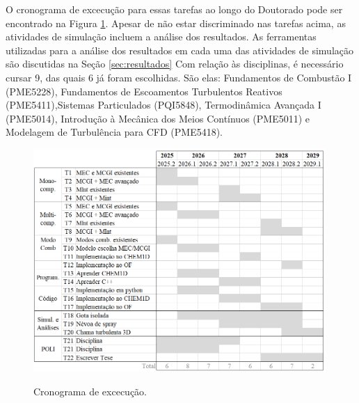 O cronograma de excecução para essas tarefas ao longo do Doutorado pode ser encontrado na Figura \ref{fig:cronograma}.
Apesar de não estar discriminado nas tarefas acima, as atividades de simulação incluem a análise dos resultados. 
As ferramentas utilizadas para a análise dos resultados em cada uma das atividades de simulação são discutidas na Seção \ref{sec:resultados}
Com relação às disciplinas, é necessário cursar 9, das quais 6 já foram escolhidas. 
São elas: Fundamentos de Combustão I (PME5228), Fundamentos de Escoamentos Turbulentos Reativos  (PME5411),Sistemas Particulados (PQI5848), Termodinâmica Avançada I (PME5014), Introdução à Mecânica dos Meios Contínuos (PME5011) e Modelagem de Turbulência para CFD (PME5418).

\begin{figure}[h]
    \centering
    \caption{Cronograma de excecução.}
    \includegraphics[width=0.99\textwidth]{30_images/cronograma-2.png}
    \label{fig:cronograma}
\end{figure}



